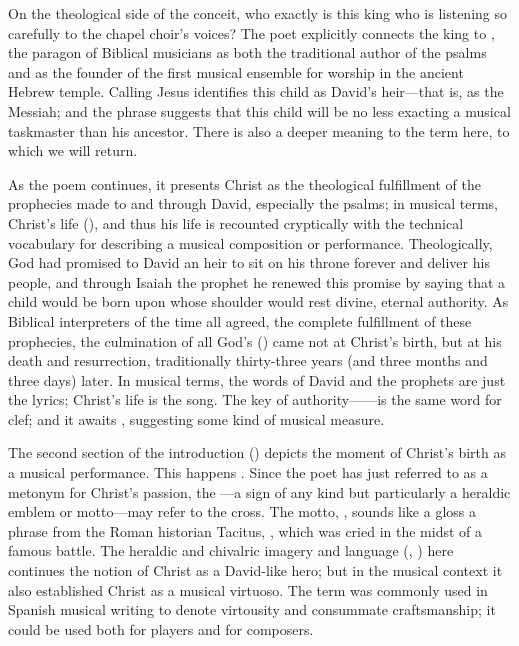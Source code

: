 On the theological side of the conceit, who exactly is this king who is
listening so carefully to the chapel choir's voices?
The poet explicitly connects the king to , the paragon
of Biblical musicians as both the traditional author of the psalms and as the
founder of the first musical ensemble for worship in the ancient Hebrew
temple.\citXXX
Calling Jesus  identifies this child as David's
heir---that is, as the Messiah; and the phrase  suggests that this child will be no less exacting a musical taskmaster
than his ancestor.
There is also a deeper meaning to the term  here, to which we will
return.

As the poem continues, it presents Christ as the theological fulfillment of the
prophecies made to and through David, especially the psalms; in musical terms,
Christ's life  (), and thus
his life is recounted cryptically with the technical vocabulary for describing a
musical composition or performance.
Theologically, God had promised to David an heir to sit on his throne forever
and deliver his people,
and through Isaiah the prophet he renewed this promise by saying that a child
would be born upon whose shoulder would rest divine, eternal authority.\citXXX
As Biblical interpreters of the time all agreed, the complete fulfillment of
these prophecies, the culmination of all God's  () came not at Christ's birth, but at his death and
resurrection, traditionally thirty-three years (and three months and three days)
later.\citXXX
In musical terms, the words of David and the prophets are just the lyrics;
Christ's life is the song.
The key of authority------is the same word for clef; and it
awaits , suggesting some kind of musical measure.

The second section of the introduction () depicts the moment of
Christ's birth as a musical performance. 
This happens . 
Since the poet has just referred to  as a metonym for
Christ's passion, the ---a sign of any kind but particularly a
heraldic emblem or motto---may refer to the cross.\citXXX
The motto, , sounds like a gloss a phrase
from the Roman historian Tacitus, , which was cried in
the midst of a famous battle.\citXXX %
The heraldic and chivalric imagery and language (,
) here continues the notion of Christ as a
David-like hero; but in the musical context it also established Christ as a
musical virtuoso.
The term  was commonly used in Spanish musical writing to
denote virtousity and consummate craftsmanship; it could be used both for
players and for composers.\citXXX

